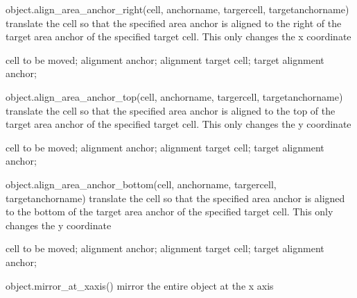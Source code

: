 \begin{APIfunc}{object.align\_area\_anchor\_right(cell, anchorname, targercell, targetanchorname)}
    translate the cell so that the specified area anchor is aligned to the right of the target area anchor of the specified target cell. This only changes the x coordinate
    \begin{APIparameters}
            cell to be moved;
            alignment anchor;
            alignment target cell;
            target alignment anchor;
    \end{APIparameters}
\end{APIfunc}
\begin{APIfunc}{object.align\_area\_anchor\_top(cell, anchorname, targercell, targetanchorname)}
    translate the cell so that the specified area anchor is aligned to the top of the target area anchor of the specified target cell. This only changes the y coordinate
    \begin{APIparameters}
            cell to be moved;
            alignment anchor;
            alignment target cell;
            target alignment anchor;
    \end{APIparameters}
\end{APIfunc}
\begin{APIfunc}{object.align\_area\_anchor\_bottom(cell, anchorname, targercell, targetanchorname)}
    translate the cell so that the specified area anchor is aligned to the bottom of the target area anchor of the specified target cell. This only changes the y coordinate
    \begin{APIparameters}
            cell to be moved;
            alignment anchor;
            alignment target cell;
            target alignment anchor;
    \end{APIparameters}
\end{APIfunc}
\begin{APIfunc}{object.mirror\_at\_xaxis()}
    mirror the entire object at the x axis
    \begin{APIparameters}
    \end{APIparameters}
\end{APIfunc}
